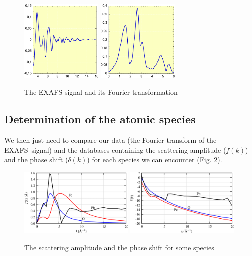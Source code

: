 \documentclass[11pt,a4paper,oneside]{report}
\begin{document}
\begin{figure}[H]
    \begin{center}
        \includegraphics[width=0.35\textwidth]{Images/BeforeFourier}
        \hspace{0.15\textwidth}
        \includegraphics[width=0.35\textwidth]{Images/AfterFourier}
        \caption{The EXAFS signal and its Fourier transformation}
        \label{fouriertransform}
    \end{center}
\end{figure}


\subsection{Determination of the atomic species}
We then just need to compare our data (the Fourier transform of the EXAFS signal) and the databases containing the scattering amplitude ($f(k)$) and the phase shift ($\delta(k)$) for each species we can encounter (Fig. \ref{databaseimages}).

\begin{figure}[H]
    \begin{center}
        \includegraphics[width=0.49\textwidth]{Images/Database1}
        \includegraphics[width=0.49\textwidth]{Images/Database2}
        \caption{The scattering amplitude and the phase shift for some species}
        \label{databaseimages}
    \end{center}
\end{figure}
\end{document}

